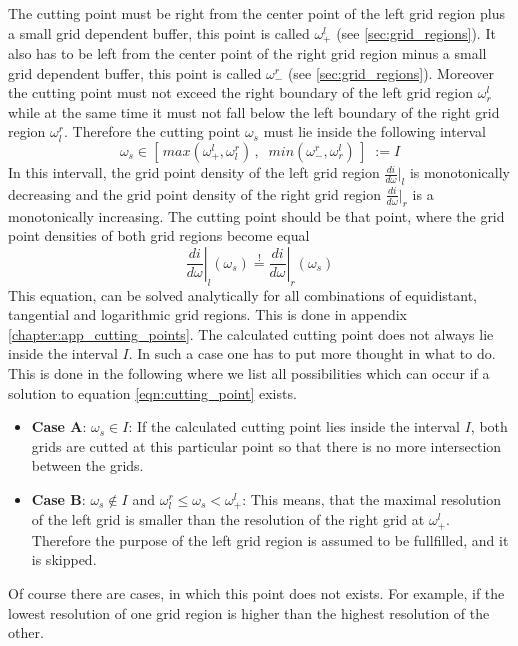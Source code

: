 The cutting point must be right from the center point of the left grid region plus a small grid dependent buffer, this point is called $\omega_+^l$ (see \ref{sec:grid_regions}). It also has to be left from the center point of the right grid region minus a small grid dependent buffer, this point is called $\omega_-^r$ (see \ref{sec:grid_regions}). Moreover the cutting point must not exceed the right boundary of the left grid region $\omega_r^l$ while at the same time it must not fall below the left boundary of the right grid region $\omega_l^r$. Therefore the cutting point $\omega_s$ must lie inside the following interval
\begin{equation}\label{eqn:cutting_point_boundaries}
	\omega_s \in [\,max(\omega_+^l, \omega_l^r)\,,\;\; min(\omega_-^r, \omega_r^l)\,]\;:=I
\end{equation}
In this intervall, the grid point density of the left grid region $\frac{di}{d\omega}|_l$ is monotonically decreasing and the grid point density of the right grid region $\frac{di}{d\omega}|_r$ is a monotonically increasing. The cutting point should be that point, where the grid point densities of both grid regions become equal
\begin{equation}\label{eqn:cutting_point}
	\left. \frac{di}{d\omega}\right|_l(\omega_s) \stackrel{!}{=} \left. \frac{di}{d\omega}\right|_r(\omega_s)
\end{equation}
This equation, can be solved analytically for all combinations of equidistant, tangential and logarithmic grid regions. This is done in appendix \ref{chapter:app_cutting_points}. The calculated cutting point does not always lie inside the interval $I$. In such a case one has to put more thought in what to do. This is done in the following where we list all possibilities which can occur if a solution to equation \ref{eqn:cutting_point} exists.

\begin{itemize} %
	\item{\bf Case A}: $\omega_s \in I$: If the calculated cutting point lies inside the interval $I$, both grids are cutted at this particular point so that there is no more intersection between the grids.

	\item{\bf Case B}: $\omega_s \notin I$ and $\omega_l^r \leq \omega_s < \omega_+^l$: This means, that the maximal resolution of the left grid is smaller than the resolution of the right grid at $\omega_+^l$. Therefore the purpose of the left grid region is assumed to be fullfilled, and it is skipped.
\end{itemize}
Of course there are cases, in which this point does not exists. For example, if the lowest resolution of one grid region is higher than the highest resolution of the other. 


